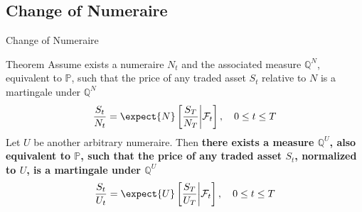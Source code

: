 \documentclass{beamer}
\begin{document}

\subsection{Change of Numeraire}
\begin{frame}{Change of Numeraire}
  \begin{block}{Theorem}
    Assume exists a numeraire $N_t$ and the associated measure $\mathbb{Q}^N$, equivalent to $\mathbb{P}$, such that the price of any traded asset $S_t$ relative to $N$ is a martingale under $\mathbb{Q}^N$
    \begin{equation*}
      \frac{S_t}{N_t} = \expect{N}\left[\frac{S_T}{N_T}\bigg|\mathcal{F}_t\right],\quad 0\le t \le T
    \end{equation*}
    Let $U$ be another arbitrary numeraire. Then \textbf{there exists a measure $\mathbb{Q}^U$, also equivalent to $\mathbb{P}$, such that the price of any traded asset $S_t$, normalized to $U$, is a martingale under $\mathbb{Q}^U$}
    \begin{equation*}
      \frac{S_t}{U_t} = \expect{U}\left[\frac{S_T}{U_T}\bigg|\mathcal{F}_t\right],\quad 0\le t \le T
    \end{equation*}
  \end{block}
\end{frame}	
\end{document}

